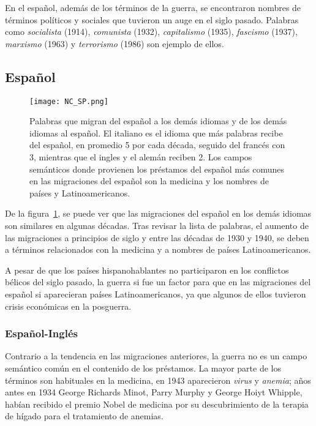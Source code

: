 En el español, además de los términos de la guerra, se encontraron nombres de términos políticos y sociales que tuvieron un auge en el siglo pasado. Palabras como  \textit{socialista} (1914), \textit{comunista} (1932), \textit{capitalismo} (1935), \textit{fascismo} (1937),  \textit{marxismo} (1963) y \textit{terrorismo} (1986) son ejemplo de ellos. 



\subsection{Español}%

\begin{figure}[h!] %
	\centering
	\texttt{[image: NC\_SP.png]}
	\caption{Palabras que migran del español a los demás idiomas y de los demás idiomas al español. El italiano es el idioma que más palabras recibe del español, en promedio 5 por cada década, seguido del francés con 3, mientras que el ingles y el alemán reciben 2. Los campos semánticos donde provienen los préstamos del español  más comunes en las migraciones del español son la medicina y los nombres de países y Latinoamericanos. }
	\label{fig.NC_SP}
\end{figure} %


De la figura~\ref{fig.NC_SP}, se puede ver que las migraciones del español en los demás idiomas son similares en algunas décadas. Tras revisar la lista de palabras,  el aumento de las migraciones a principios de siglo y entre las décadas de 1930 y 1940, se deben a términos  relacionados con la medicina y a  nombres de países Latinoamericanos.

A pesar de que los países hispanohablantes no participaron en los conflictos bélicos del siglo pasado, la guerra si fue un factor para que  en las migraciones del español si aparecieran países Latinoamericanos, ya que algunos de ellos tuvieron crisis económicas en la posguerra. 


\subsubsection*{Español-Inglés}%

Contrario a la tendencia en las migraciones anteriores, la guerra no es un campo semántico común en el contenido de los préstamos. La mayor parte de los términos son habituales en la medicina,  en 1943  aparecieron  \textit{virus} y \textit{anemia};  años antes en 1934 George Richards Minot, Parry Murphy y George Hoiyt Whipple, habían recibido el premio Nobel de medicina por su descubrimiento de la terapia de hígado para el tratamiento de anemias.   

